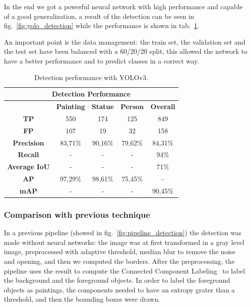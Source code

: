In the end we got a powerful neural network with high performance and capable of a good generalization, a result of the detection can be seen in fig.~\ref{fig:yolo_detection} while the performance is shown in tab.~\ref{tab:detection_performance}.

An important point is the data management: the train set, the validation set and the test set have been balanced with a 60/20/20 split, this allowed the network to have a better performance and to predict classes in a correct way.



\begin{table}[ht!]
    \centering
\begin{tabular}{|c|c|c|c|c|}
\hline
\multicolumn{5}{|c|}{\textbf{Detection Performance}}       \\ \hline
\multicolumn{1}{|l|}{} & \textbf{Painting} & \textbf{Statue} & \textbf{Person} & \textbf{Overall} \\ \hline
\textbf{TP}        & 550     & 174     & 125     & 849     \\ \hline
\textbf{FP}        & 107     & 19      & 32      & 158     \\ \hline
\textbf{Precision} & 83,71\% & 90,16\% & 79,62\% & 84,31\% \\ \hline
\textbf{Recall}    & -       & -       & -       & 94\%    \\ \hline
\textbf{Average IoU}       & -       & -       & -       & 71\%    \\ \hline
\textbf{AP}        & 97,29\% & 98,61\% & 75,45\% & -       \\ \hline
\textbf{mAP}       & -       & -       & -       & 90,45\% \\ \hline
\end{tabular}
\caption{Detection performance with YOLOv3.}
    \label{tab:detection_performance}
\end{table}



\subsubsection{Comparison with previous technique}
In a previous pipeline (showed in fig.~\ref{fig:pipeline_detection}) the detection was made without neural networks: the image was at first transformed in a gray level image, preprocessed with adaptive threshold, median blur \cite{median-blur} to remove the noise and opening, and then we computed the borders.
After the preprocessing, the pipeline uses the result to compute the Connected Component Labeling~\cite{Grana_ccl} to label the background and the foreground objects.
In order to label the foreground objects as paintings, the components needed to have an entropy grater than a threshold, and then the bounding boxes were drawn.

